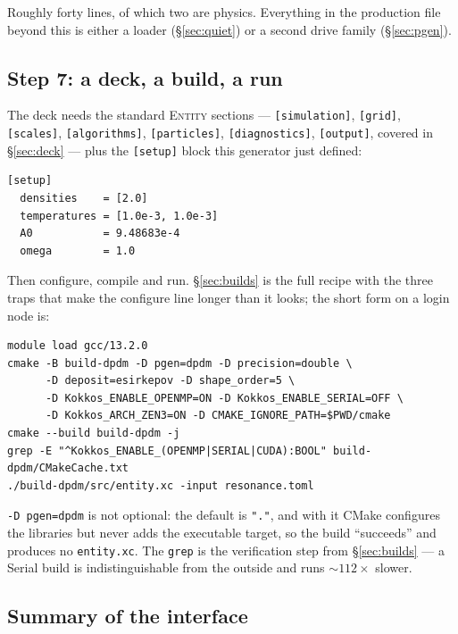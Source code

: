 \documentclass[11pt,a4paper]{article}
\newcommand{\code}[1]{\texttt{\small #1}}
\begin{document}
Roughly forty lines, of which two are physics. Everything in the production file
beyond this is either a loader (\S\ref{sec:quiet}) or a second drive family
(\S\ref{sec:pgen}).

\subsection{Step 7: a deck, a build, a run}

The deck needs the standard \textsc{Entity} sections --- \code{[simulation]},
\code{[grid]}, \code{[scales]}, \code{[algorithms]}, \code{[particles]},
\code{[diagnostics]}, \code{[output]}, covered in \S\ref{sec:deck} --- plus the
\code{[setup]} block this generator just defined:

\begin{lstlisting}
[setup]
  densities    = [2.0]
  temperatures = [1.0e-3, 1.0e-3]
  A0           = 9.48683e-4
  omega        = 1.0
\end{lstlisting}

Then configure, compile and run. \S\ref{sec:builds} is the full recipe with the three
traps that make the configure line longer than it looks; the short form on a login
node is:

\begin{lstlisting}
module load gcc/13.2.0
cmake -B build-dpdm -D pgen=dpdm -D precision=double \
      -D deposit=esirkepov -D shape_order=5 \
      -D Kokkos_ENABLE_OPENMP=ON -D Kokkos_ENABLE_SERIAL=OFF \
      -D Kokkos_ARCH_ZEN3=ON -D CMAKE_IGNORE_PATH=$PWD/cmake
cmake --build build-dpdm -j
grep -E "^Kokkos_ENABLE_(OPENMP|SERIAL|CUDA):BOOL" build-dpdm/CMakeCache.txt
./build-dpdm/src/entity.xc -input resonance.toml
\end{lstlisting}

\code{-D pgen=dpdm} is not optional: the default is \code{"."}, and with it CMake
configures the libraries but never adds the executable target, so the build
``succeeds'' and produces no \code{entity.xc}. The \code{grep} is the verification
step from \S\ref{sec:builds} --- a Serial build is indistinguishable from the outside
and runs ${\sim}112\times$ slower.

\subsection{Summary of the interface}
\end{document}
